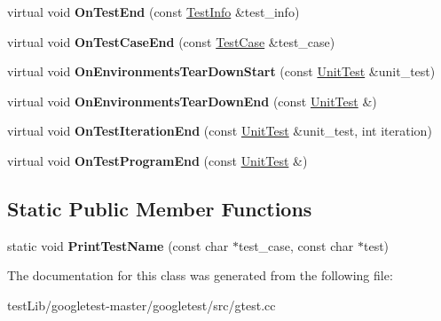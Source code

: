 \begin{DoxyCompactItemize}
\item 
\mbox{\label{classtesting_1_1internal_1_1PrettyUnitTestResultPrinter_a06749ff2b32a16c127374ecd015f13e0}} 
virtual void {\bfseries On\+Test\+End} (const \hyperlink{classtesting_1_1TestInfo}{Test\+Info} \&test\+\_\+info)
\item 
\mbox{\label{classtesting_1_1internal_1_1PrettyUnitTestResultPrinter_a7a62fe58fa6f6aace813eb62b31e5a51}} 
virtual void {\bfseries On\+Test\+Case\+End} (const \hyperlink{classtesting_1_1TestCase}{Test\+Case} \&test\+\_\+case)
\item 
\mbox{\label{classtesting_1_1internal_1_1PrettyUnitTestResultPrinter_afea9dc849c92fdbc1d8505f4c74ffc1a}} 
virtual void {\bfseries On\+Environments\+Tear\+Down\+Start} (const \hyperlink{classtesting_1_1UnitTest}{Unit\+Test} \&unit\+\_\+test)
\item 
\mbox{\label{classtesting_1_1internal_1_1PrettyUnitTestResultPrinter_ab23094ef3b714778b2f742d39818c280}} 
virtual void {\bfseries On\+Environments\+Tear\+Down\+End} (const \hyperlink{classtesting_1_1UnitTest}{Unit\+Test} \&)
\item 
\mbox{\label{classtesting_1_1internal_1_1PrettyUnitTestResultPrinter_ac29b30216023baddda04ef5889f484ff}} 
virtual void {\bfseries On\+Test\+Iteration\+End} (const \hyperlink{classtesting_1_1UnitTest}{Unit\+Test} \&unit\+\_\+test, int iteration)
\item 
\mbox{\label{classtesting_1_1internal_1_1PrettyUnitTestResultPrinter_a8c92c062889abdb940b04ffe113f5980}} 
virtual void {\bfseries On\+Test\+Program\+End} (const \hyperlink{classtesting_1_1UnitTest}{Unit\+Test} \&)
\end{DoxyCompactItemize}
\subsection*{Static Public Member Functions}
\begin{DoxyCompactItemize}
\item 
\mbox{\label{classtesting_1_1internal_1_1PrettyUnitTestResultPrinter_a5b60a9aed1db02837b11450f6e8d0f71}} 
static void {\bfseries Print\+Test\+Name} (const char $\ast$test\+\_\+case, const char $\ast$test)
\end{DoxyCompactItemize}


The documentation for this class was generated from the following file\+:\begin{DoxyCompactItemize}
\item 
test\+Lib/googletest-\/master/googletest/src/gtest.\+cc\end{DoxyCompactItemize}
